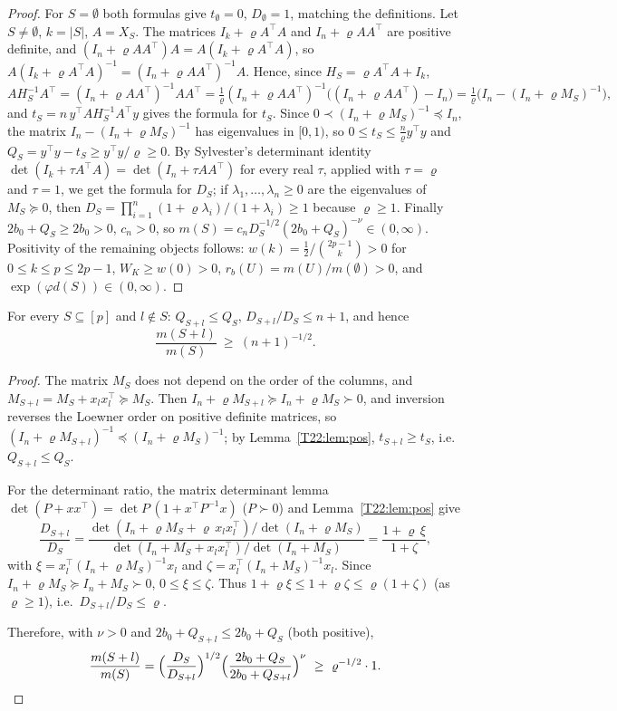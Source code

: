 \documentclass[11pt]{report}
\begin{document}
\begin{proof}
For $S=\emptyset$ both formulas give $t_\emptyset=0$, $D_\emptyset=1$, matching the definitions. Let $S\neq\emptyset$, $k=|S|$, $A=X_S$. The matrices $I_k+\varrho A^\top A$ and $I_n+\varrho AA^\top$ are positive definite, and $(I_n+\varrho AA^\top)A=A(I_k+\varrho A^\top A)$, so $A(I_k+\varrho A^\top A)^{-1}=(I_n+\varrho AA^\top)^{-1}A$. Hence, since $H_S=\varrho A^\top A+I_k$,
\[
AH_S^{-1}A^\top=(I_n+\varrho AA^\top)^{-1}AA^\top=\tfrac1\varrho(I_n+\varrho AA^\top)^{-1}\bigl((I_n+\varrho AA^\top)-I_n\bigr)=\tfrac1\varrho\bigl(I_n-(I_n+\varrho M_S)^{-1}\bigr),
\]
and $t_S=n\,y^\top AH_S^{-1}A^\top y$ gives the formula for $t_S$. Since $0\prec(I_n+\varrho M_S)^{-1}\preceq I_n$, the matrix $I_n-(I_n+\varrho M_S)^{-1}$ has eigenvalues in $[0,1)$, so $0\le t_S\le \frac{n}{\varrho} y^\top y$ and $Q_S=y^\top y-t_S\ge y^\top y/\varrho\ge 0$. By Sylvester's determinant identity $\det(I_k+\tau A^\top A)=\det(I_n+\tau AA^\top)$ for every real $\tau$, applied with $\tau=\varrho$ and $\tau=1$, we get the formula for $D_S$; if $\lambda_1,\dots,\lambda_n\ge0$ are the eigenvalues of $M_S\succeq0$, then $D_S=\prod_{i=1}^n(1+\varrho\lambda_i)/(1+\lambda_i)\ge1$ because $\varrho\ge1$. Finally $2b_0+Q_S\ge 2b_0>0$, $c_n>0$, so $m(S)=c_nD_S^{-1/2}(2b_0+Q_S)^{-\nu}\in(0,\infty)$. Positivity of the remaining objects follows: $w(k)=\tfrac12/\binom{2p-1}{k}>0$ for $0\le k\le p\le 2p-1$, $W_K\ge w(0)>0$, $r_b(U)=m(U)/m(\emptyset)>0$, and $\exp(\varphi d(S))\in(0,\infty)$.
\end{proof}

\begin{T22lemma}\label{T22:lem:add}
For every $S\subseteq[p]$ and $l\notin S$: $Q_{S+l}\le Q_S$, $D_{S+l}/D_S\le n+1$, and hence
\[
\frac{m(S+l)}{m(S)}\ \ge\ (n+1)^{-1/2}.
\]
\end{T22lemma}

\begin{proof}
The matrix $M_S$ does not depend on the order of the columns, and $M_{S+l}=M_S+x_lx_l^\top\succeq M_S$. Then $I_n+\varrho M_{S+l}\succeq I_n+\varrho M_S\succ0$, and inversion reverses the Loewner order on positive definite matrices, so $(I_n+\varrho M_{S+l})^{-1}\preceq (I_n+\varrho M_S)^{-1}$; by Lemma~\ref{T22:lem:pos}, $t_{S+l}\ge t_S$, i.e.\ $Q_{S+l}\le Q_S$.

For the determinant ratio, the matrix determinant lemma $\det(P+xx^\top)=\det P\,(1+x^\top P^{-1}x)$ ($P\succ0$) and Lemma~\ref{T22:lem:pos} give
\[
\frac{D_{S+l}}{D_S}=\frac{\det(I_n+\varrho M_S+\varrho\,x_lx_l^\top)/\det(I_n+\varrho M_S)}{\det(I_n+M_S+x_lx_l^\top)/\det(I_n+M_S)}=\frac{1+\varrho\,\xi}{1+\zeta},
\]
with $\xi=x_l^\top(I_n+\varrho M_S)^{-1}x_l$ and $\zeta=x_l^\top(I_n+M_S)^{-1}x_l$. Since $I_n+\varrho M_S\succeq I_n+M_S\succ0$, $0\le\xi\le\zeta$. Thus $1+\varrho\xi\le 1+\varrho\zeta\le \varrho(1+\zeta)$ (as $\varrho\ge1$), i.e.\ $D_{S+l}/D_S\le \varrho$.

Therefore, with $\nu>0$ and $2b_0+Q_{S+l}\le 2b_0+Q_S$ (both positive),
\[
\frac{m(S+l)}{m(S)}=\Bigl(\frac{D_S}{D_{S+l}}\Bigr)^{1/2}\Bigl(\frac{2b_0+Q_S}{2b_0+Q_{S+l}}\Bigr)^{\nu}\ \ge\ \varrho^{-1/2}\cdot 1 .\qedhere
\]
\end{proof}
\end{document}

